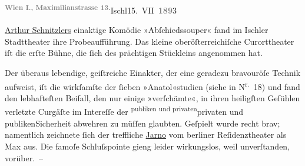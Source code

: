 \pstart
           \raggedleft{}\substVorne{}\textsuperscript{\textcolor{gray}{\textbf{Wien I., Maximilianstrasse 13.}}}\substDazwischen{}Ischl\substHinten{}{ }15. VII \textcolor{gray}{\textbf{189}}3\pend
           \pend
           
\pstart
           \uline{Arthur Schnitzlers} einaktige Komödie »Abſchiedssouper« fand im Ischler Stadttheater ihre Probeaufführung. Das kleine oberöſterreichiſche Curorttheater iſt die erſte
               Bühne, die ſich des prächtigen Stückleins angenommen hat.\pend
           
\pstart
           Der überaus lebendige, geiſtreiche Einakter, der eine geradezu bravouröſe Technik
               aufweist, iſt die wirkſamſte der ſieben »Anatol«studien (siehe \label{K_L00239-5v}\label{K_L00239-5} in N\textsuperscript{r.} 18) und fand den lebhafteſten Beifall, den nur einige »verſchämte«, in
               ihren heiligſten Gefühlen verletzte Curgäſte im Intereſſe der \substVorne{}\textsuperscript{publiken und privaten}\substDazwischen{}privaten und publiken\substHinten{}{ }Sicherheit abwehren zu müſſen glaubten. Geſpielt
               wurde recht brav; namentlich zeichnete ſich der treffliche \uline{Jarno} vom berliner Reſidenztheater als Max aus. Die famoſe
               Schluſspointe gieng leider wirkungslos, weil unverſtanden, vorüber. –\pend
           
